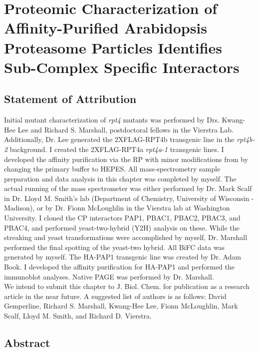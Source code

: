 \chapter{Proteomic Characterization of Affinity-Purified Arabidopsis Proteasome Particles Identifies Sub-Complex Specific Interactors}

\section{Statement of Attribution}
Initial mutant characterization of \textit{rpt4} mutants was performed by Drs. Kwang-Hee Lee and Richard S. Marshall, postdoctoral fellows in the Vierstra Lab. Additionally, Dr. Lee generated the 2XFLAG-RPT4b transgenic line in the \textit{rpt4b-2} background.  I created the 2XFLAG-RPT4a \textit{rpt4a-1} transgenic lines. I developed the affinity purification via the RP with minor modifications from \citep{book10} by changing the primary buffer to HEPES. All mass-spectrometry sample preparation and data analysis in this chapter was completed by myself.  The actual running of the mass spectrometer was either performed by Dr. Mark Scalf in Dr. Lloyd M. Smith's lab (Department of Chemistry, University of Wisconsin - Madison), or by Dr. Fionn McLoughlin in the Vierstra lab at Washington University.  I cloned the CP interactors PAP1, PBAC1, PBAC2, PBAC3, and PBAC4, and performed yeast-two-hybrid (Y2H) analysis on these.  While the streaking and yeast transformations were accomplished by myself, Dr. Marshall performed the final spotting of the yeast-two hybrid.  All BiFC data was generated by myself.  The HA-PAP1 transgenic line was created by Dr. Adam Book.  I developed the affinity purification for HA-PAP1 and performed the immunoblot analyses.  Native PAGE was performed by Dr. Marshall. \\


\noindent
We intend to submit this chapter to J. Biol. Chem. for publication as a research article in the near future.  A suggested list of authors is as follows: David Gemperline, Richard S. Marshall, Kwang-Hee Lee, Fionn McLoughlin, Mark Scalf, Lloyd M. Smith, and Richard D. Vierstra. 

\section{Abstract}

